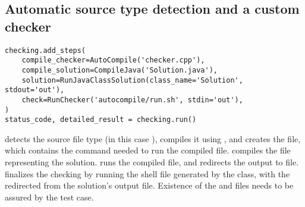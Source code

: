 \subsection{Automatic source type detection and a custom checker}

\begin{verbatim}
checking.add_steps(
    compile_checker=AutoCompile('checker.cpp'),
    compile_solution=CompileJava('Solution.java'),
    solution=RunJavaClassSolution(class_name='Solution', stdout='out'),
    check=RunChecker('autocompile/run.sh', stdin='out'),
)
status_code, detailed_result = checking.run()
\end{verbatim}

 detects the source file type (in this case ), compiles it using , and creates
the  file, which contains the command needed to run the compiled file.
 compiles the  file representing the solution.
 runs the compiled  file, and redirects the output to  file.
 finalizes the checking by running the shell file generated by the  class, with the
 redirected from the solution's output file.
Existence of the  and  files needs to be assured by the test case.
